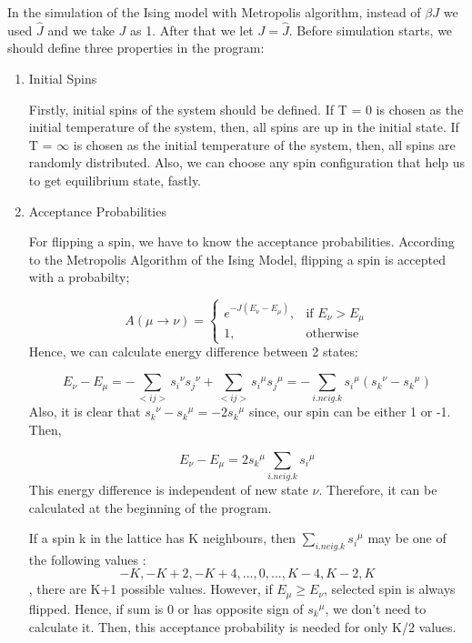 \documentclass[12pt,fleqn]{report}
\begin{document}
In the simulation of the Ising model with Metropolis algorithm, instead of 
$\beta J $ we used $\hat{J}$ and we take $ J$ as 1. After that we let $J = 
\hat{J}$. Before simulation starts, we should define three properties in the 
program:
\begin{enumerate}

\item Initial Spins

Firstly, initial spins of the system should be defined. If T = 0 is chosen as 
the initial temperature of the system, then, all spins are up in the initial 
state. If T = $\infty$ is chosen as the initial temperature of the system, 
then, all spins are randomly distributed. Also, we can choose any spin 
configuration that help us to get equilibrium state, fastly. 

\item Acceptance Probabilities

For flipping a spin, we have to know the acceptance probabilities.  
According to the Metropolis Algorithm of the Ising Model, flipping a spin is 
accepted with a probabilty; 

\[
    A(\mu \rightarrow \nu)= 
\begin{cases}
    e^{- J (E_\nu - E_\mu)},& \text{if } E_\nu > E_\mu\\
    1,              & \text{otherwise}
\end{cases}
\]
Hence, we can calculate energy difference between 2 states:

\begin{equation}
E_\nu - E_\mu = - \sum\limits_{<ij>} {s_i}^\nu {s_j}^\nu  +  
\sum\limits_{<ij>} {s_i}^\mu {s_j}^\mu = - \sum\limits_{i. neig. k} 
{s_i}^\mu  ({s_k}^\nu - {s_k}^\mu )
\end{equation}
Also, it is clear that ${s_k}^\nu - {s_k}^\mu  = -2 {s_k}^\mu$ since, our 
spin can be either 1 or -1. Then,

\begin{equation}
E_\nu - E_\mu = 2   {s_k}^\mu \sum\limits_{i.neig.k} {s_i}^\mu 
\end{equation}
This energy difference is independent of new state $\nu$. Therefore, it can 
be calculated at the beginning of the program.

If a spin k in the lattice has K neighbours, then $\sum\limits_{i.neig.k} 
{s_i}^\mu $ may be one of the following values : $$ -K , -K+2 , -K+4, ..., 
0, ..., K-4, K-2, K$$, there are K+1 possible values.  However, if $E_\mu 
\geq E_\nu$, selected spin is always flipped. Hence, if sum is 0 or has 
opposite sign of ${s_k}^\mu$, we don't need to calculate it. Then, this 
acceptance probability is needed for only K/2 values.


\end{enumerate}
\end{document}

